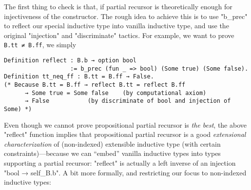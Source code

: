 The first thing to check is that, if partial recursor is theoretically enough for injectiveness of the constructor. The rough idea to achieve this
is to use "b_prec" to reflect our special inductive type into vanilla
inductive type, and use the original "injection" and "discriminate"
tactics. For example, we want to prove \texttt{B.tt ≠
B.ff}, we simply 
\begin{verbatim}
Definition reflect : B.b → option bool 
                   := b_prec (fun _ => bool) (Some true) (Some false).
Definition tt_neq_ff : B.tt = B.ff → False.
(* Because B.tt = B.ff → reflect B.tt = reflect B.ff 
      → Some true = Some false    (by computational axiom)
      → False           (by discriminate of bool and injection of Some) *)
\end{verbatim}


Even though we cannot prove propositional partial recursor is \textit{the best},
the above "reflect" function implies that propositional partial
recursor is a good \textit{extensional characterization} of (non-indexed) extensible inductive type (with certain constraints)---because we can ``embed'' vanilla inductive types into
types supporting a partial recursor: "reflect" is actually a left
inverse of an injection "bool → self_B.b". A bit more formally, and
restricting our focus to non-indexed inductive types:

